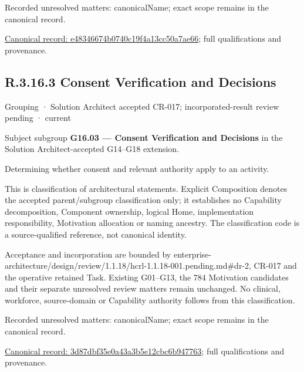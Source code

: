 {\small Recorded unresolved matters: canonicalName; exact scope remains in the canonical record.}\par
{\footnotesize \href{../../../../continuum/grouping/e48346674b0740c19f4a13cc50a7ae66.md}{Canonical record: e48346674b0740c19f4a13cc50a7ae66}; full qualifications and provenance.}\par
\subsection*{R.3.16.3 Consent Verification and Decisions}
\label{navigation:R.3.16.3}

\label{element:3d87dbf35e0a43a3b5e12cbc6b947763}
{\small Grouping · Solution Architect accepted CR-017; incorporated-result review pending · current}\par

Subject subgroup \textbf{G16.03 — Consent Verification and Decisions} in the Solution Architect-accepted G14–G18 extension.



Determining whether consent and relevant authority apply to an activity.



This is classification of architectural statements. Explicit Composition denotes the accepted parent/subgroup classification only; it establishes no Capability decomposition, Component ownership, logical Home, implementation responsibility, Motivation allocation or naming ancestry. The classification code is a source-qualified reference, not canonical identity.



Acceptance and incorporation are bounded by enterprise-architecture/design/review/1.1.18/hcrl-1.1.18-001.pending.md\#dr-2, CR-017 and the operative retained Task. Existing G01–G13, the 784 Motivation candidates and their separate unresolved review matters remain unchanged. No clinical, workforce, source-domain or Capability authority follows from this classification.


{\small Recorded unresolved matters: canonicalName; exact scope remains in the canonical record.}\par
{\footnotesize \href{../../../../continuum/grouping/3d87dbf35e0a43a3b5e12cbc6b947763.md}{Canonical record: 3d87dbf35e0a43a3b5e12cbc6b947763}; full qualifications and provenance.}\par
